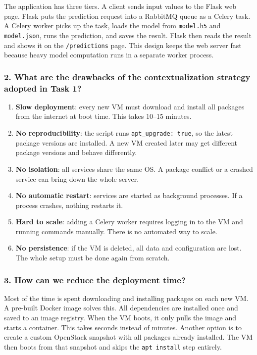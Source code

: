 \documentclass[11pt,a4paper]{article}
\begin{document}
The application has three tiers. A client sends input values to the Flask web page.
Flask puts the prediction request into a RabbitMQ queue as a Celery task. A Celery
worker picks up the task, loads the model from \texttt{model.h5} and
\texttt{model.json}, runs the prediction, and saves the result. Flask then reads
the result and shows it on the \texttt{/predictions} page. This design keeps the
web server fast because heavy model computation runs in a separate worker process.

\subsubsection*{2. What are the drawbacks of the contextualization strategy adopted in Task 1?}

\begin{enumerate}[leftmargin=1.5cm]
  \item \textbf{Slow deployment}: every new VM must download and install all
        packages from the internet at boot time. This takes 10--15 minutes.
  \item \textbf{No reproducibility}: the script runs \texttt{apt\_upgrade: true},
        so the latest package versions are installed. A new VM created later may get
        different package versions and behave differently.
  \item \textbf{No isolation}: all services share the same OS. A package conflict
        or a crashed service can bring down the whole server.
  \item \textbf{No automatic restart}: services are started as background processes.
        If a process crashes, nothing restarts it.
  \item \textbf{Hard to scale}: adding a Celery worker requires logging in to the VM
        and running commands manually. There is no automated way to scale.
  \item \textbf{No persistence}: if the VM is deleted, all data and configuration
        are lost. The whole setup must be done again from scratch.
\end{enumerate}

\subsubsection*{3. How can we reduce the deployment time?}

Most of the time is spent downloading and installing packages on each new VM.
A pre-built Docker image solves this. All dependencies are installed once and
saved to an image registry. When the VM boots, it only pulls the image and starts
a container. This takes seconds instead of minutes. Another option is to create
a custom OpenStack snapshot with all packages already installed. The VM then boots
from that snapshot and skips the \texttt{apt install} step entirely.
\end{document}
